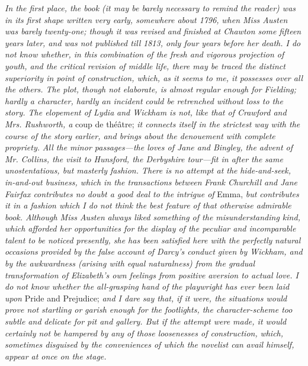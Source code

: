 \documentclass[12pt,openright]{book}
\begin{document}
\textit{In the first place, the book (it may be barely necessary to remind the}\textit{ }\textit{reader) was in its first shape written very early, somewhere about 1796,}\textit{ }\textit{when Miss Austen was barely twenty-one; though it was revised and}\textit{ }\textit{finished at Chawton some fifteen years later, and was not published till}\textit{ }\textit{1813, only four years before her death. I do not know whether, in}\textit{ }\textit{this}\textit{ }\textit{combination of the fresh and vigorous projection of youth, and the}\textit{ }\textit{critical revision of middle life, there may be traced the distinct}\textit{ }\textit{superiority in point of construction, which, as it seems to me, it}\textit{ }\textit{possesses over all the others. The plot, though not elaborate, is almost}\textit{ }\textit{regular enough for Fielding; hardly a character, hardly an incident}\textit{ }\textit{could be retrenched without loss to the story. The elopement of Lydia}\textit{ }\textit{and Wickham is not, like that of Crawford and Mrs. Rushworth, a} coup de théâtre; \textit{it connects itself in the strictest way with the course of the}\textit{ }\textit{story earlier, and brings about the denouement with complete propriety.}\textit{ }\textit{All the minor passages—the loves of Jane and Bingley, the advent of Mr.}\textit{ }\textit{Collins, the visit to Hunsford, the Derbyshire tour—fit in after the}\textit{ }\textit{same unostentatious, but masterly fashion. There is no attempt at the}\textit{ }\textit{hide-and-seek, in-and-out business, which in the transactions between}\textit{ }\textit{Frank Churchill and Jane Fairfax contributes no doubt a good deal to the}\textit{ }\textit{intrigue of} Emma, \textit{but contributes it in a fashion which I do not think}\textit{ }\textit{the best feature of that otherwise admirable book. Although Miss Austen}\textit{ }\textit{always liked something of the misunderstanding kind, which afforded her}\textit{ }\textit{opportunities for the display of the peculiar and incomparable talent to}\textit{ }\textit{be noticed presently, she has been satisfied here with the perfectly}\textit{ }\textit{natural occasions provided by the false account of Darcy’s conduct given}\textit{ }\textit{by Wickham, and by the awkwardness (arising with equal naturalness) from}\textit{ }\textit{the gradual transformation of Elizabeth’s own feelings from positive}\textit{ }\textit{aversion to actual love. I do not know whether the all-grasping hand of}\textit{ }\textit{the playwright has ever been laid upon} Pride and Prejudice; \textit{and I dare}\textit{ }\textit{say that,}\textit{ }\textit{if it were, the situations would prove not startling or}\textit{ }\textit{garish enough for the footlights, the character-scheme too subtle and}\textit{ }\textit{delicate for pit and gallery. But if the attempt were made, it would}\textit{ }\textit{certainly not be hampered by any of those loosenesses of construction,}\textit{ }\textit{which, sometimes disguised by the conveniences of which the novelist can}\textit{ }\textit{avail himself, appear at once on the stage.}
\end{document}
